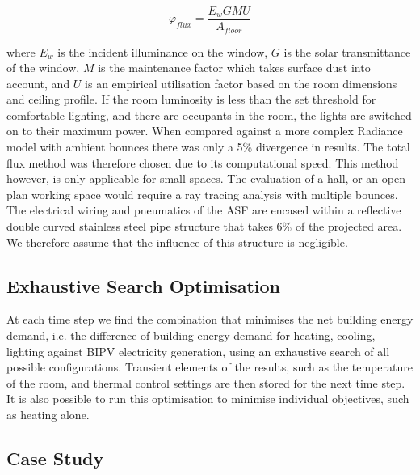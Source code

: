 \begin{equation} 
\label{eq:lighting}
      \varphi_{flux}={\frac{E_w G M U}{A_{floor}}}
\end{equation}

where $E_w$ is the incident illuminance on the window, $G$ is the solar transmittance of the window, $M$ is the maintenance factor which takes surface dust into account, and $U$ is an empirical utilisation factor based on the room dimensions and ceiling profile. If the room luminosity is less than the set threshold for comfortable lighting, and there are occupants in the room, the lights are switched on to their maximum power. When compared against a more complex Radiance model with ambient bounces there was only a 5\% divergence in results. The total flux method was therefore chosen due to its computational speed. This method however, is only applicable for small spaces. The evaluation of a hall, or an open plan working space would require a ray tracing analysis with multiple bounces. The electrical wiring and pneumatics of the ASF are encased within a reflective double curved stainless steel pipe structure that takes 6\% of the projected area. We therefore assume that the influence of this structure is negligible. 

\subsection{Exhaustive Search Optimisation}

At each time step we find the combination that minimises the net building energy demand, i.e. the difference of building energy demand for heating, cooling, lighting against BIPV electricity generation, using an exhaustive search of all possible configurations. Transient elements of the results, such as the temperature of the room, and thermal control settings are then stored for the next time step. It is also possible to run this optimisation to minimise individual objectives, such as heating alone.



\subsection{Case Study}

